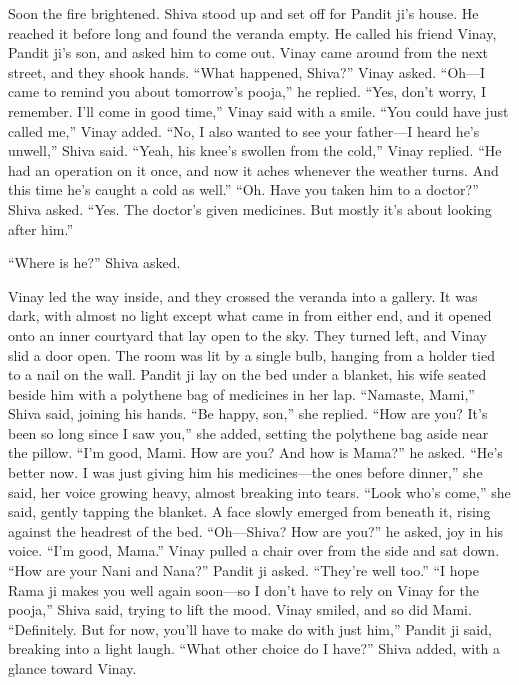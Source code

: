 Soon the fire brightened. Shiva stood up and set off for Pandit ji's house. He reached it before long and found the veranda empty. He called his friend Vinay, Pandit ji's son, and asked him to come out. Vinay came around from the next street, and they shook hands. ``What happened, Shiva?'' Vinay asked. ``Oh—I came to remind you about tomorrow's pooja,'' he replied. ``Yes, don't worry, I remember. I'll come in good time,'' Vinay said with a smile. ``You could have just called me,'' Vinay added. ``No, I also wanted to see your father—I heard he's unwell,'' Shiva said. ``Yeah, his knee's swollen from the cold,'' Vinay replied. ``He had an operation on it once, and now it aches whenever the weather turns. And this time he's caught a cold as well.'' ``Oh. Have you taken him to a doctor?'' Shiva asked. ``Yes. The doctor's given medicines. But mostly it's about looking after him.''

``Where is he?'' Shiva asked.

Vinay led the way inside, and they crossed the veranda into a gallery. It was dark, with almost no light except what came in from either end, and it opened onto an inner courtyard that lay open to the sky. They turned left, and Vinay slid a door open. The room was lit by a single bulb, hanging from a holder tied to a nail on the wall. Pandit ji lay on the bed under a blanket, his wife seated beside him with a polythene bag of medicines in her lap. ``Namaste, Mami,'' Shiva said, joining his hands. ``Be happy, son,'' she replied. ``How are you? It's been so long since I saw you,'' she added, setting the polythene bag aside near the pillow. ``I'm good, Mami. How are you? And how is Mama?'' he asked. ``He's better now. I was just giving him his medicines—the ones before dinner,'' she said, her voice growing heavy, almost breaking into tears. ``Look who's come,'' she said, gently tapping the blanket. A face slowly emerged from beneath it, rising against the headrest of the bed. ``Oh—Shiva? How are you?'' he asked, joy in his voice. ``I'm good, Mama.'' Vinay pulled a chair over from the side and sat down. ``How are your Nani and Nana?'' Pandit ji asked. ``They're well too.''
``I hope Rama ji makes you well again soon—so I don't have to rely on Vinay for the pooja,'' Shiva said, trying to lift the mood. Vinay smiled, and so did Mami. ``Definitely. But for now, you'll have to make do with just him,'' Pandit ji said, breaking into a light laugh. ``What other choice do I have?'' Shiva added, with a glance toward Vinay.